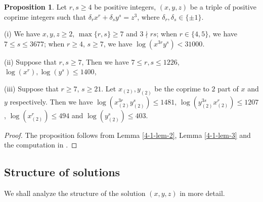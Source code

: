\documentclass[a4paper, 12pt]{article}
\numberwithin{equation}{section}
\theoremstyle{definition}
\newtheorem{prop}[thm]{Proposition}
\begin{document}
\begin{prop} \label{4-1-prop}
Let $r,s \ge 4$ be positive integers, $(x,y,z)$ be a triple of positive coprime integers such that $\delta_r x^r + \delta_s y^s = z^3$, where $\delta_r,\delta_s \in \{\pm 1\}$. 

(i) We have $x,y,z \ge 2$, $\max\{r,s\} \ge 7$ and $3 \nmid rs$;
when $r \in \{4,5\}$, we have $7 \le s \le 3677$;
when $r\ge 4$, $s\ge 7$, we have $\log(x^{3r} y^s) < 31000$.

(ii) Suppose that $r,s \ge 7$, Then we have $7\le r,s \le 1226$, $\log(x^r), \log(y^s) \le 1400$,

(iii) Suppose that $r\ge 7$, $s\ge 21$. Let $x_{(2)}, y_{(2)}$ be the coprime to $2$ part of $x$ and $y$ respectively. 
Then we have $\log(x_{(2)}^{3r}  y_{(2)}^s ) \le 1481$, $ \log(y_{(2)}^{3s}  x_{(2)}^r ) \le 1207$, $\log(x_{(2)}^r) \le 494$ and $\log(y_{(2)}^s) \le 403$.
\end{prop}
\begin{proof}
The proposition follows from Lemma \ref{4-1-lem-2}, Lemma \ref{4-1-lem-3} and the computation in \cite{code_of_zpzhou}.
\end{proof}

\subsection{Structure of solutions}


We shall analyze the structure of the solution $(x,y,z)$ in more detail.
\end{document}

